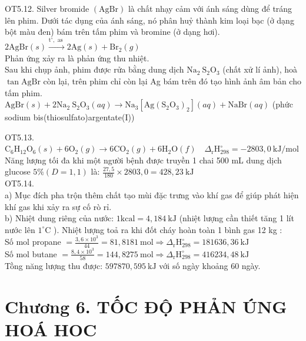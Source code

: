 \documentclass[10pt]{article}
\begin{document}
OT5.12. Silver bromide $(\mathrm{AgBr})$ là chất nhạy cảm với ánh sáng dùng để tráng lên phim. Dưới tác dụng của ánh sáng, nó phân huỷ thành kim loại bạc (ở dạng bột màu đen) bám trên tấm phim và bromine (ở dạng hơi).\\
$2 \mathrm{AgBr}(s) \xrightarrow{\mathrm{t}^{\circ}, \text { as }} 2 \mathrm{Ag}(s)+\mathrm{Br}_{2}(g)$\\
Phản ứng xảy ra là phản ứng thu nhiệt.\\
Sau khi chụp ảnh, phim được rửa bằng dung dịch $\mathrm{Na}_{2} \mathrm{~S}_{2} \mathrm{O}_{3}$ (chất xử lí ảnh), hoà $\tan \mathrm{AgBr}$ còn lại, trên phim chỉ còn lại Ag bám trên đó tạo hình ảnh âm bản cho tấm phim.\\
$\mathrm{AgBr}(s)+2 \mathrm{Na}_{2} \mathrm{~S}_{2} \mathrm{O}_{3}(a q) \rightarrow \mathrm{Na}_{3}\left[\mathrm{Ag}\left(\mathrm{S}_{2} \mathrm{O}_{3}\right)_{2}\right](a q)+\mathrm{NaBr}(a q)$ (phức sodium bis(thiosulfato)argentate(I))

OT5.13. $\mathrm{C}_{6} \mathrm{H}_{12} \mathrm{O}_{6}(s)+6 \mathrm{O}_{2}(g) \rightarrow 6 \mathrm{CO}_{2}(g)+6 \mathrm{H}_{2} \mathrm{O}(f) \quad \Delta_{\mathrm{r}} \mathrm{H}_{298}^{\circ}=-2803,0 \mathrm{~kJ} / \mathrm{mol}$\\
Năng lượng tối đa khi một người bệnh được truyền 1 chai 500 mL dung dịch glucose $5 \%(D=1,1)$ là: $\frac{27,5}{180} \times 2803,0=428,23 \mathrm{~kJ}$\\
OT5.14.\\
a) Mục đích pha trộn thêm chất tạo mùi đặc trưng vào khí gas để giúp phát hiện khí gas khi xảy ra sự cố rò rỉ.\\
b) Nhiệt dung riêng của nước: $1 \mathrm{kcal}=4,184 \mathrm{~kJ}$ (nhiệt lượng cần thiết tăng 1 lít nước lên $1^{\circ} \mathrm{C}$ ). Nhiệt lượng toả ra khi đốt cháy hoàn toàn 1 bình gas 12 kg :\\
Số mol propane $=\frac{3,6 \times 10^{3}}{44}=81,8181 \mathrm{~mol} \Rightarrow \Delta_{\mathrm{r}} \mathrm{H}_{298}^{\circ}=181636,36 \mathrm{~kJ}$\\
Số mol butane $=\frac{8,4 \times 10^{3}}{58}=144,8275 \mathrm{~mol} \Rightarrow \Delta_{\mathrm{r}} \mathrm{H}_{298}^{\circ}=416234,48 \mathrm{~kJ}$\\
Tồng năng lượng thu được: $597870,595 \mathrm{~kJ}$ với số ngày khoảng 60 ngày.

\section*{Chương 6. TỐC ĐỘ PHẢN ÚNG HOÁ HOC}
\end{document}
